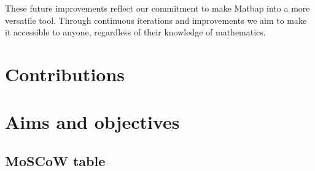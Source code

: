 \documentclass[a4paper, oneside, 11pt]{report}
\begin{document}
These future improvements reflect our commitment to make Matbap into a more versatile tool. Through continuous iterations and improvements we aim to make it accessible to anyone, regardless of their knowledge of mathematics.


\raggedright



\appendix
\chapter{Contributions}



\chapter{Aims and objectives}
\section{MoSCoW table}
\label{appendix:moscow}
\end{document}
